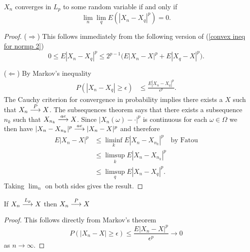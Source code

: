 \begin{theorem}
\label{cauchy for Lp}
$X_n$ converges in $L_p$ to some random variable if and only if
\begin{equation}
\lim_n \lim_q E (|X_n-X_q|^p)=0.
\end{equation}
\end{theorem}
\begin{proof}
($\Longrightarrow$) This follows immediately from the following version of (\ref{convex ineq for normp 2})
\[
 0\leq E|X_n-X_q|^p\leq 2^{p-1}\bigl(E|X_n-X|^p + E|X_q-X|^p\bigr).
\]

($\Longleftarrow$)
By Markov's inequality
\begin{align*}
P(|X_n - X_q|\geq \epsilon) &\leq \frac{E|X_n - X_q|^p}{\epsilon^p}.
\end{align*}
The Cauchy criterion for convergence in probability implies there exists a $X$ such that $X_n\overset{\small P} \longrightarrow X$.
The subsequences theorem says that there exists a subsequence $n_k$ such that $X_{n_k}\overset{\small ae} \longrightarrow X$.
Since $|X_n(\omega) - \cdot|^p$ is continuous for each $\omega\in \Omega$ we then have $|X_n - X_{n_k}|^p \overset{\small ae} \longrightarrow |X_n - X|^p$ and therefore
\begin{align*}
 E|X_n - X|^p &\leq \liminf_k E|X_n - X_{n_k}|^p\quad \text{by Fatou}\\
 &\leq \limsup_k E|X_n - X_{n_k}|^p\\
 &\leq \limsup_q E|X_n - X_q|^p.
 \end{align*}
 Taking $\lim_n$ on both sides gives the result.



\end{proof}


\begin{theorem}
\label{thm Lp implies P}
If $X_n \overset{\small L_p} \longrightarrow X$ then $X_n \overset{\small P} \longrightarrow X$
\end{theorem}
\begin{proof}
This follows directly from Markov's theorem
\[
P(|X_n -X|\geq \epsilon)\leq \frac{E|X_n - X|^p}{\epsilon^p}\rightarrow 0
\]
as $n\rightarrow \infty$.
\end{proof}



